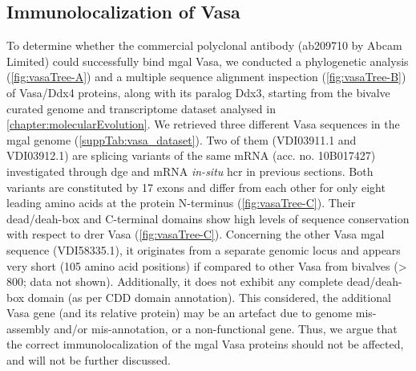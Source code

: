 \subsection{Immunolocalization of Vasa}
To determine whether the commercial polyclonal antibody (ab209710 by Abcam Limited) could successfully bind \gls{mgal} Vasa, we conducted a phylogenetic analysis (\cref{fig:vasaTree-A}) and a multiple sequence alignment inspection (\cref{fig:vasaTree-B}) of Vasa/Ddx4 proteins, along with its paralog Ddx3, starting from the bivalve curated genome and transcriptome dataset analysed in \cref{chapter:molecularEvolution}. We retrieved three different Vasa sequences in the \gls{mgal} genome (\cref{suppTab:vasa_dataset}). Two of them (VDI03911.1 and VDI03912.1) are splicing variants of the same mRNA (acc. no. 10B017427) investigated through \gls{dge} and mRNA \textit{in-situ} \gls{hcr} in previous sections. Both variants are constituted by 17 exons and differ from each other for only eight leading amino acids at the protein N-terminus (\cref{fig:vasaTree-C}). Their \gls{dead/deah-box} and C-terminal domains show high levels of sequence conservation with respect to \gls{drer} Vasa (\cref{fig:vasaTree-C}). Concerning the other Vasa \gls{mgal} sequence (VDI58335.1), it originates from a separate genomic locus and appears very short (105 amino acid positions) if compared to other Vasa from bivalves (\num{> 800}; data not shown). Additionally, it does not exhibit any complete \gls{dead/deah-box} domain (as per CDD domain annotation). This considered, the additional Vasa gene (and its relative protein) may be an artefact due to genome mis-assembly and/or mis-annotation, or a non-functional gene. Thus, we argue that the correct immunolocalization of the \gls{mgal} Vasa proteins should not be affected, and will not be further discussed.


